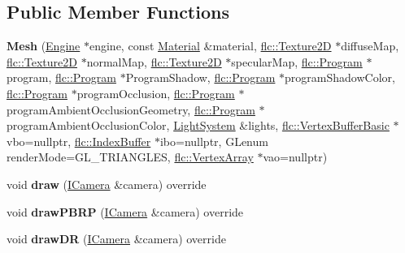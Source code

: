 \subsection*{Public Member Functions}
\begin{DoxyCompactItemize}
\item 
{\bfseries Mesh} (\hyperlink{classflw_1_1Engine}{Engine} $\ast$engine, const \hyperlink{classflw_1_1flf_1_1Material}{Material} \&material, \hyperlink{classflw_1_1flc_1_1Texture2D}{flc\+::\+Texture2D} $\ast$diffuse\+Map, \hyperlink{classflw_1_1flc_1_1Texture2D}{flc\+::\+Texture2D} $\ast$normal\+Map, \hyperlink{classflw_1_1flc_1_1Texture2D}{flc\+::\+Texture2D} $\ast$specular\+Map, \hyperlink{classflw_1_1flc_1_1Program}{flc\+::\+Program} $\ast$program, \hyperlink{classflw_1_1flc_1_1Program}{flc\+::\+Program} $\ast$Program\+Shadow, \hyperlink{classflw_1_1flc_1_1Program}{flc\+::\+Program} $\ast$program\+Shadow\+Color, \hyperlink{classflw_1_1flc_1_1Program}{flc\+::\+Program} $\ast$program\+Occlusion, \hyperlink{classflw_1_1flc_1_1Program}{flc\+::\+Program} $\ast$program\+Ambient\+Occlusion\+Geometry, \hyperlink{classflw_1_1flc_1_1Program}{flc\+::\+Program} $\ast$program\+Ambient\+Occlusion\+Color, \hyperlink{classflw_1_1flf_1_1LightSystem}{Light\+System} \&lights, \hyperlink{classflw_1_1flc_1_1VertexBufferBasic}{flc\+::\+Vertex\+Buffer\+Basic} $\ast$vbo=nullptr, \hyperlink{classflw_1_1flc_1_1IndexBuffer}{flc\+::\+Index\+Buffer} $\ast$ibo=nullptr, G\+Lenum render\+Mode=G\+L\+\_\+\+T\+R\+I\+A\+N\+G\+L\+ES, \hyperlink{classflw_1_1flc_1_1VertexArray}{flc\+::\+Vertex\+Array} $\ast$vao=nullptr)\hypertarget{classflw_1_1flf_1_1Mesh_a5950330390dbf7d380dd26dac5bea487}{}\label{classflw_1_1flf_1_1Mesh_a5950330390dbf7d380dd26dac5bea487}

\item 
void {\bfseries draw} (\hyperlink{classflw_1_1flf_1_1ICamera}{I\+Camera} \&camera) override\hypertarget{classflw_1_1flf_1_1Mesh_aeaa3f84dd6e5837f13a9cd51c2b88158}{}\label{classflw_1_1flf_1_1Mesh_aeaa3f84dd6e5837f13a9cd51c2b88158}

\item 
void {\bfseries draw\+P\+B\+RP} (\hyperlink{classflw_1_1flf_1_1ICamera}{I\+Camera} \&camera) override\hypertarget{classflw_1_1flf_1_1Mesh_ac029b54934debf9c6aa934dd9d3f464b}{}\label{classflw_1_1flf_1_1Mesh_ac029b54934debf9c6aa934dd9d3f464b}

\item 
void {\bfseries draw\+DR} (\hyperlink{classflw_1_1flf_1_1ICamera}{I\+Camera} \&camera) override\hypertarget{classflw_1_1flf_1_1Mesh_ac42a9703abe3a6fedf8ae6423a71848f}{}\label{classflw_1_1flf_1_1Mesh_ac42a9703abe3a6fedf8ae6423a71848f}


\end{DoxyCompactItemize}
